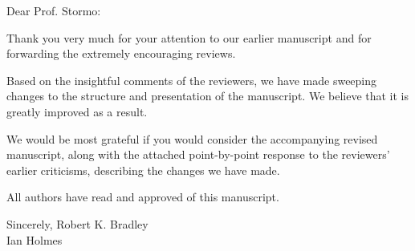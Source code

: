 \documentclass[10pt]{letter}
\begin{document}
\begin{letter}{}

\opening{Dear Prof. Stormo:}

\vspace{\baselineskip}

Thank you very much for your attention to our earlier manuscript and for forwarding the extremely encouraging reviews.

Based on the insightful comments of the reviewers, we have made sweeping changes to the structure and presentation of the manuscript.
We believe that it is greatly improved as a result.

We would be most grateful if you would consider the accompanying revised manuscript, along with the attached point-by-point response to the reviewers' earlier criticisms,
describing the changes we have made.

All authors have read and approved of this manuscript.



\closing{Sincerely,\vskip 20pt Robert K. Bradley\\Ian Holmes}


\end{letter}
\end{document}
